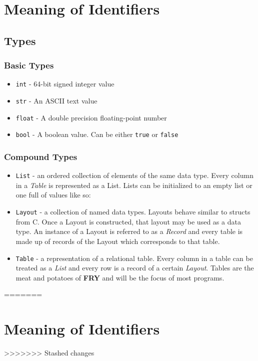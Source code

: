 \documentclass{article}
\begin{document}
\section{Meaning of Identifiers}
\subsection{Types}
\label{sec:types}
\subsubsection{Basic Types}
\label{sec:prims}
\begin{itemize}
\item \texttt{int} - 64-bit signed integer value
\item \texttt{str} - An ASCII text value
\item \texttt{float} - A double precision floating-point number
\item \texttt{bool} - A boolean value. Can be either \texttt{true} or \texttt{false}
\end{itemize}

\subsubsection{Compound Types}

\begin{itemize} 

\item \texttt{List} - an ordered collection of elements of the same data type. Every column in a \emph{Table} is represented as a List. Lists can be initialized to an empty list or one full of values like so:

\item \texttt{Layout} - a collection of named data types. Layouts behave similar to structs from C. Once a Layout is constructed, that layout may be used as a data type.  An instance of a Layout is referred to as a \emph{Record} and every table is made up of records of the Layout which corresponds to that table.

\item \texttt{Table} - a representation of a relational table. Every column in a table can be treated as a \emph{List} and every row is a record of a certain \emph{Layout}. Tables are the meat and potatoes of \textbf{FRY} and will be the focus of most programs.

\end{itemize}
=======
\section{Meaning of Identifiers}
>>>>>>> Stashed changes
\end{document}
